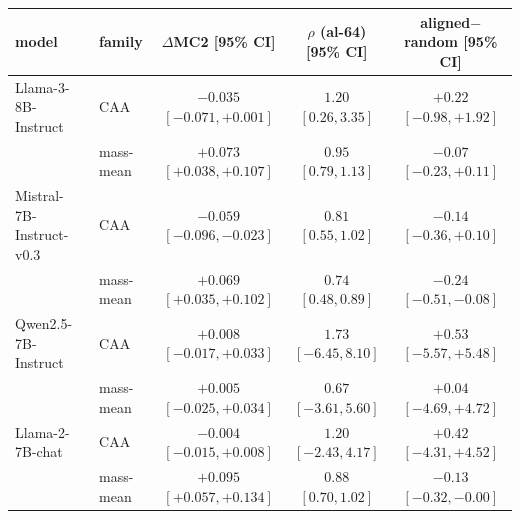 \begin{tabular}{llccc}
\toprule
model & family & $\Delta$MC2 [95\% CI] & $\rho$ (al-64) [95\% CI] & aligned$-$random [95\% CI] \\
\midrule
Llama-3-8B-Instruct & CAA & $-0.035$ {\scriptsize $[-0.071, +0.001]$} & \textcolor{black!42}{$1.20$ {\scriptsize $[0.26, 3.35]$}} & \textcolor{black!42}{$+0.22$ {\scriptsize $[-0.98, +1.92]$}} \\
 & mass-mean & $+0.073$ {\scriptsize $[+0.038, +0.107]$} & $0.95$ {\scriptsize $[0.79, 1.13]$} & $-0.07$ {\scriptsize $[-0.23, +0.11]$} \\
\midrule
Mistral-7B-Instruct-v0.3 & CAA & $-0.059$ {\scriptsize $[-0.096, -0.023]$} & \textcolor{black!42}{$0.81$ {\scriptsize $[0.55, 1.02]$}} & \textcolor{black!42}{$-0.14$ {\scriptsize $[-0.36, +0.10]$}} \\
 & mass-mean & $+0.069$ {\scriptsize $[+0.035, +0.102]$} & $0.74$ {\scriptsize $[0.48, 0.89]$} & $-0.24$ {\scriptsize $[-0.51, -0.08]$} \\
\midrule
Qwen2.5-7B-Instruct & CAA & $+0.008$ {\scriptsize $[-0.017, +0.033]$} & \textcolor{black!42}{$1.73$ {\scriptsize $[-6.45, 8.10]$}} & \textcolor{black!42}{$+0.53$ {\scriptsize $[-5.57, +5.48]$}} \\
 & mass-mean & $+0.005$ {\scriptsize $[-0.025, +0.034]$} & \textcolor{black!42}{$0.67$ {\scriptsize $[-3.61, 5.60]$}} & \textcolor{black!42}{$+0.04$ {\scriptsize $[-4.69, +4.72]$}} \\
\midrule
Llama-2-7B-chat & CAA & $-0.004$ {\scriptsize $[-0.015, +0.008]$} & \textcolor{black!42}{$1.20$ {\scriptsize $[-2.43, 4.17]$}} & \textcolor{black!42}{$+0.42$ {\scriptsize $[-4.31, +4.52]$}} \\
 & mass-mean & $+0.095$ {\scriptsize $[+0.057, +0.134]$} & $0.88$ {\scriptsize $[0.70, 1.02]$} & $-0.13$ {\scriptsize $[-0.32, -0.00]$} \\
\bottomrule
\end{tabular}
